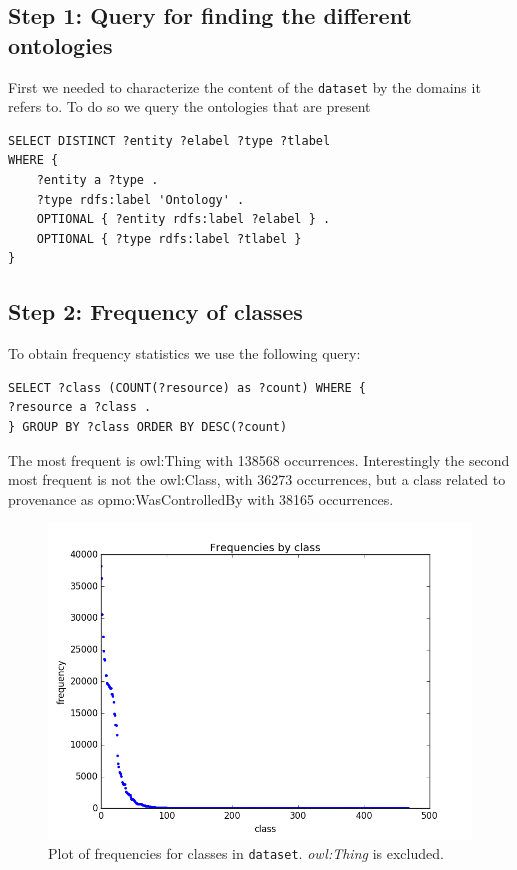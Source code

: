 \documentclass[runningheads,a4paper]{../../StyleFiles/llncs}
\begin{document}
\subsection{Step 1: Query for finding the different ontologies}
First we needed to characterize the content of the \texttt{dataset} by the domains it refers to. To do so we query the ontologies that are present 

\begin{lstlisting}[captionpos=b, caption=SPARQL query for getting different Ontologies in the \texttt{dataset}, label=lst:sparql, basicstyle=\ttfamily\small,frame=bt]
SELECT DISTINCT ?entity ?elabel ?type ?tlabel 
WHERE { 
	?entity a ?type .
	?type rdfs:label 'Ontology' .
	OPTIONAL { ?entity rdfs:label ?elabel } . 
	OPTIONAL { ?type rdfs:label ?tlabel } 
}
\end{lstlisting}


\subsection{Step 2: Frequency of classes}
To obtain frequency statistics we use the following query:

\begin{lstlisting}[captionpos=b, caption=SPARQL query for getting Event witSh Location, label=lst:sparql, basicstyle=\ttfamily\small,frame=bt]
SELECT ?class (COUNT(?resource) as ?count) WHERE {
?resource a ?class . 
} GROUP BY ?class ORDER BY DESC(?count)
\end{lstlisting}

The most frequent is owl:Thing with 138568 occurrences. Interestingly the second most frequent is not the owl:Class, with 36273 occurrences, but a class related to provenance as opmo:WasControlledBy with 38165 occurrences. 

\begin{figure}[h]
	\centering
	\includegraphics[width=1\textwidth]{img/dataset_frequency.png}
	\caption{Plot of frequencies for classes in \texttt{dataset}. \textit{owl:Thing} is excluded.}
	\label{fig:frequency}
\end{figure}
\end{document}
